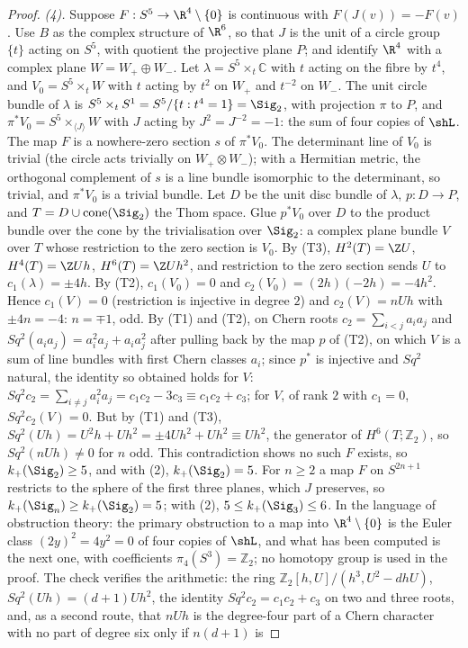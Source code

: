 \begin{proof}
\emph{(4).} Suppose $F : S^{5} \to \R^{4} \setminus \{0\}$ is continuous with $F(J(v)) = -F(v)$. Use $B$ as the complex structure of $\R^{6}$, so that $J$ is the unit of a circle group $\{t\}$ acting on $S^{5}$, with quotient the projective plane $P$; and identify $\R^{4}$ with a complex plane $W = W_{+} \oplus W_{-}$. Let $\lambda = S^{5} \times_{t} \mathbb{C}$ with $t$ acting on the fibre by $t^{4}$, and $V_{0} = S^{5} \times_{t} W$ with $t$ acting by $t^{2}$ on $W_{+}$ and $t^{-2}$ on $W_{-}$. The unit circle bundle of $\lambda$ is $S^{5} \times_{t} S^{1} = S^{5}/\{t : t^{4} = 1\} = \Sig_{2}$, with projection $\pi$ to $P$, and $\pi^{*}V_{0} = S^{5} \times_{\langle J \rangle} W$ with $J$ acting by $J^{2} = J^{-2} = -1$: the sum of four copies of $\shL$. The map $F$ is a nowhere-zero section $s$ of $\pi^{*}V_{0}$. The determinant line of $V_{0}$ is trivial (the circle acts trivially on $W_{+} \otimes W_{-}$); with a Hermitian metric, the orthogonal complement of $s$ is a line bundle isomorphic to the determinant, so trivial, and $\pi^{*}V_{0}$ is a trivial bundle. Let $D$ be the unit disc bundle of $\lambda$, $p : D \to P$, and $T = D \cup \mathrm{cone}(\Sig_{2})$ the Thom space. Glue $p^{*}V_{0}$ over $D$ to the product bundle over the cone by the trivialisation over $\Sig_{2}$: a complex plane bundle $V$ over $T$ whose restriction to the zero section is $V_{0}$. By (T3), $H^{2}(T) = \Z U$, $H^{4}(T) = \Z Uh$, $H^{6}(T) = \Z Uh^{2}$, and restriction to the zero section sends $U$ to $c_{1}(\lambda) = \pm 4h$. By (T2), $c_{1}(V_{0}) = 0$ and $c_{2}(V_{0}) = (2h)(-2h) = -4h^{2}$. Hence $c_{1}(V) = 0$ (restriction is injective in degree $2$) and $c_{2}(V) = nUh$ with $\pm 4n = -4$: $n = \mp 1$, odd. By (T1) and (T2), on Chern roots $c_{2} = \sum_{i<j}a_{i}a_{j}$ and $Sq^{2}(a_{i}a_{j}) = a_{i}^{2}a_{j} + a_{i}a_{j}^{2}$ after pulling back by the map $p$ of (T2), on which $V$ is a sum of line bundles with first Chern classes $a_{i}$; since $p^{*}$ is injective and $Sq^{2}$ natural, the identity so obtained holds for $V$: $Sq^{2}c_{2} = \sum_{i \neq j}a_{i}^{2}a_{j} = c_{1}c_{2} - 3c_{3} \equiv c_{1}c_{2} + c_{3}$; for $V$, of rank $2$ with $c_{1} = 0$, $Sq^{2}c_{2}(V) = 0$. But by (T1) and (T3), $Sq^{2}(Uh) = U^{2}h + Uh^{2} = \pm 4Uh^{2} + Uh^{2} \equiv Uh^{2}$, the generator of $H^{6}(T; \mathbb{Z}_{2})$, so $Sq^{2}(nUh) \neq 0$ for $n$ odd. This contradiction shows no such $F$ exists, so $k_{+}(\Sig_{2}) \geq 5$, and with (2), $k_{+}(\Sig_{2}) = 5$. For $n \geq 2$ a map $F$ on $S^{2n+1}$ restricts to the sphere of the first three planes, which $J$ preserves, so $k_{+}(\Sig_{n}) \geq k_{+}(\Sig_{2}) = 5$; with (2), $5 \leq k_{+}(\Sig_{3}) \leq 6$. In the language of obstruction theory: the primary obstruction to a map into $\R^{4} \setminus \{0\}$ is the Euler class $(2y)^{2} = 4y^{2} = 0$ of four copies of $\shL$, and what has been computed is the next one, with coefficients $\pi_{4}(S^{3}) = \mathbb{Z}_{2}$; no homotopy group is used in the proof. The check verifies the arithmetic: the ring $\mathbb{Z}_{2}[h, U]/(h^{3}, U^{2} - dhU)$, $Sq^{2}(Uh) = (d+1)Uh^{2}$, the identity $Sq^{2}c_{2} = c_{1}c_{2} + c_{3}$ on two and three roots, and, as a second route, that $nUh$ is the degree-four part of a Chern character with no part of degree six only if $n(d+1)$ is 
\end{proof}
